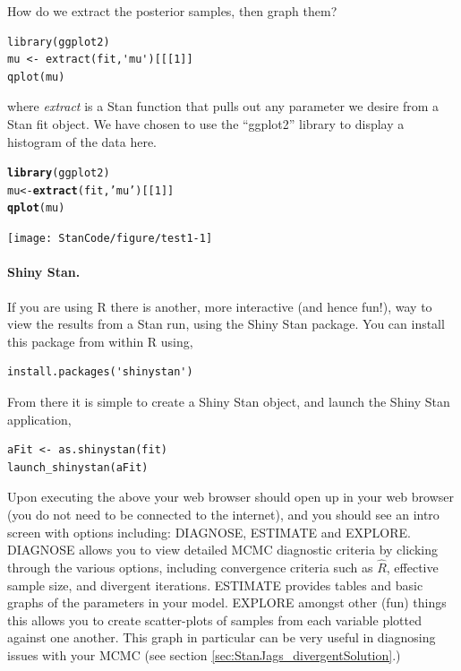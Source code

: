 \documentclass[11pt,fullpage]{book}
\newcommand{\hlnum}[1]{\textcolor[rgb]{0.686,0.059,0.569}{#1}}%
\newcommand{\hlstr}[1]{\textcolor[rgb]{0.192,0.494,0.8}{#1}}%
\newcommand{\hlstd}[1]{\textcolor[rgb]{0.345,0.345,0.345}{#1}}%
\newcommand{\hlkwb}[1]{\textcolor[rgb]{0.69,0.353,0.396}{#1}}%
\newcommand{\hlkwd}[1]{\textcolor[rgb]{0.737,0.353,0.396}{\textbf{#1}}}%
\newenvironment{knitrout}{}{} %
\begin{document}
How do we extract the posterior samples, then graph them?

\begin{verbatim}
library(ggplot2)
mu <- extract(fit,'mu')[[[1]]
qplot(mu)
\end{verbatim}

where \textit{extract} is a Stan function that pulls out any parameter we desire from a Stan fit object. We have chosen to use the ``ggplot2'' library to display a histogram of the data here.

\begin{knitrout}
\begin{alltt}
\hlkwd{library}\hlstd{(ggplot2)}
\hlstd{mu} \hlkwb{<-} \hlkwd{extract}\hlstd{(fit,}\hlstr{'mu'}\hlstd{)[[}\hlnum{1}\hlstd{]]}
\hlkwd{qplot}\hlstd{(mu)}
\end{alltt}
\texttt{[image: StanCode/figure/test1-1]} 
\end{knitrout}

\paragraph{Shiny Stan.} If you are using R there is another, more interactive (and hence fun!), way to view the results from a Stan run, using the Shiny Stan package. You can install this package from within R using,

\begin{verbatim}
install.packages('shinystan')
\end{verbatim}

From there it is simple to create a Shiny Stan object, and launch the Shiny Stan application,

\begin{verbatim}
aFit <- as.shinystan(fit)
launch_shinystan(aFit)
\end{verbatim}

Upon executing the above your web browser should open up  in your web browser (you do not need to be connected to the internet), and you should see an intro screen with options including: DIAGNOSE, ESTIMATE and EXPLORE. DIAGNOSE allows you to view detailed MCMC diagnostic criteria by clicking through the various options, including convergence criteria such as $\hat{R}$, effective sample size, and divergent iterations. ESTIMATE provides tables and basic graphs of the parameters in your model. EXPLORE amongst other (fun) things this allows you to create scatter-plots of samples from each variable plotted against one another. This graph in particular can be very useful in diagnosing issues with your MCMC (see section \ref{sec:StanJags_divergentSolution}.) 
\end{document}
